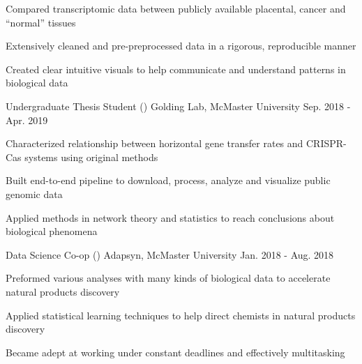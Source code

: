 \begin{cventries}
{\begin{cvitems}
\item {Compared transcriptomic data between publicly available placental, cancer and ``normal'' tissues}
\item {Extensively cleaned and pre-preprocessed data in a rigorous, reproducible manner}
\item {Created clear intuitive visuals to help communicate and understand patterns in biological data}
\end{cvitems}
}
\cventry
{Undergraduate Thesis Student ()}
{Golding Lab, McMaster University}
{Sep. 2018 - Apr. 2019}
{}
{
\begin{cvitems}
    \item {Characterized relationship between horizontal gene transfer rates and CRISPR-Cas systems using original methods}
    \item {Built end-to-end pipeline to download, process, analyze and visualize public genomic data}
    \item {Applied methods in network theory and statistics to reach conclusions about biological phenomena}
\end{cvitems}
}
\cventry
{Data Science Co-op ()}
{Adapsyn, McMaster University}
{Jan. 2018 - Aug. 2018}
{}
{
\begin{cvitems}
    \item {Preformed various analyses with many kinds of biological data to accelerate natural products discovery}
    \item {Applied statistical learning techniques to help direct chemists in natural products discovery}
    \item {Became adept at working under constant deadlines and effectively multitasking}
\end{cvitems}
}

\end{cventries}
